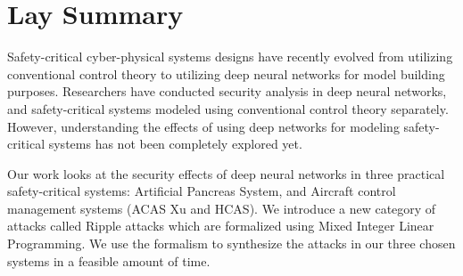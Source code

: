 

\chapter{Lay Summary}

Safety-critical cyber-physical systems designs have recently evolved from utilizing conventional control theory to utilizing deep neural networks for model building purposes. Researchers have conducted security analysis in deep neural networks, and safety-critical systems modeled using conventional control theory separately.  However, understanding the effects of using deep networks for modeling safety-critical systems has not been completely explored yet. 

Our work looks at the security effects of deep neural networks in three practical safety-critical systems: Artificial Pancreas System, and Aircraft control management systems (ACAS Xu and HCAS). We introduce a new category of attacks called Ripple attacks which are formalized using Mixed Integer Linear Programming. We use the formalism to synthesize the attacks in our three chosen systems in a feasible amount of time. 


